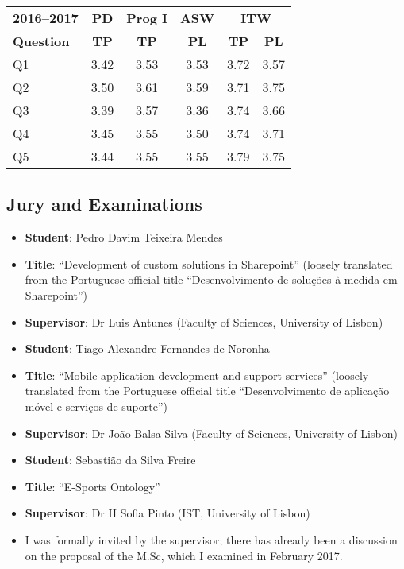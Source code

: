 \begin{table}[H]
\begin{tabular}{lccccc}
\toprule
\bfseries 2016--2017
 & \bfseries PD
 & \bfseries Prog I
 & \bfseries ASW
 & \multicolumn{2}{c}{\bfseries ITW} \\
\bfseries Question
 & \bfseries TP
 & \bfseries TP
 & \bfseries PL
 & \bfseries TP
 & \bfseries PL \\
\midrule
Q1 & 3.42 & 3.53 & 3.53 & 3.72 & 3.57 \\
Q2 & 3.50 & 3.61 & 3.59 & 3.71 & 3.75 \\
Q3 & 3.39 & 3.57 & 3.36 & 3.74 & 3.66 \\
Q4 & 3.45 & 3.55 & 3.50 & 3.74 & 3.71 \\
Q5 & 3.44 & 3.55 & 3.55 & 3.79 & 3.75 \\
\bottomrule
\end{tabular}
\end{table}


\subsection{Jury and Examinations}

\begin{itemize}
    \item \textbf{Student}: Pedro Davim Teixeira Mendes
    \item \textbf{Title}: ``Development of custom solutions in Sharepoint'' (loosely translated from the Portuguese official title ``Desenvolvimento de soluções à medida em Sharepoint'')
    \item \textbf{Supervisor}: Dr Luis Antunes (Faculty of Sciences, University of Lisbon)
\end{itemize}

\begin{itemize}
    \item \textbf{Student}: Tiago Alexandre Fernandes de Noronha
    \item \textbf{Title}: ``Mobile application development and support services'' (loosely translated from the Portuguese official title ``Desenvolvimento de aplicação móvel e serviços de suporte'')
    \item \textbf{Supervisor}: Dr João Balsa Silva (Faculty of Sciences, University of Lisbon)
\end{itemize}

\begin{itemize}
    \item \textbf{Student}: Sebastião da Silva Freire
    \item \textbf{Title}: ``E-Sports Ontology''
    \item \textbf{Supervisor}: Dr H Sofia Pinto (IST, University of Lisbon)
    \item I was formally invited by the supervisor; there has already been a discussion on the proposal of the M.Sc, which I examined in February 2017.
\end{itemize}

